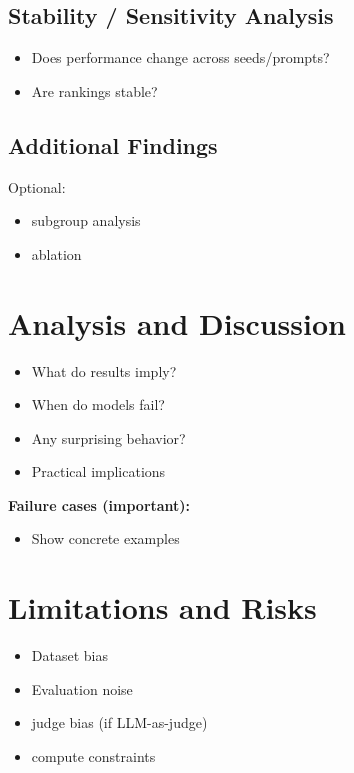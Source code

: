\documentclass[11pt]{article}
\begin{document}
\subsection{Stability / Sensitivity Analysis}

\begin{itemize}
    \item Does performance change across seeds/prompts?
    \item Are rankings stable?
\end{itemize}

\subsection{Additional Findings}

Optional:
\begin{itemize}
    \item subgroup analysis
    \item ablation
\end{itemize}

\section{Analysis and Discussion}

\begin{itemize}[leftmargin=*]
    \item What do results imply?
    \item When do models fail?
    \item Any surprising behavior?
    \item Practical implications
\end{itemize}

\textbf{Failure cases (important):}
\begin{itemize}
    \item Show concrete examples
\end{itemize}

\section{Limitations and Risks}

\begin{itemize}
    \item Dataset bias
    \item Evaluation noise
    \item judge bias (if LLM-as-judge)
    \item compute constraints
\end{itemize}
\end{document}
